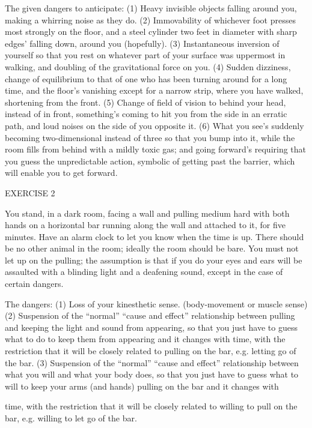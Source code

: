 The given dangers to anticipate: 
(1) Heavy invisible objects falling around you, making a whirring noise as 
they do. 
(2) Immovability of whichever foot presses most strongly on the floor, and 
a steel cylinder two feet in diameter with sharp edges’ falling down, around 
you (hopefully). 
(3) Instantaneous inversion of yourself so that you rest on whatever part of 
your surface was uppermost in walking, and doubling of the gravitational 
force on you. 
(4) Sudden dizziness, change of equilibrium to that of one who has been 
turning around for a long time, and the floor’s vanishing except for a narrow 
strip, where you have walked, shortening from the front. 
(5) Change of field of vision to behind your head, instead of in front, 
something’s coming to hit you from the side in an erratic path, and loud 
noises on the side of you opposite it. 
(6) What you see’s suddenly becoming two-dimensional instead of three so 
that you bump into it, while the room fills from behind with a mildly toxic gas; 
and going forward’s requiring that you guess the unpredictable action, 
symbolic of getting past the barrier, which will enable you to get forward. 


EXERCISE 2 

You stand, in a dark room, facing a wall and pulling medium hard with both 
hands on a horizontal bar running along the wall and attached to it, for five 
minutes. Have an alarm clock to let you know when the time is up. There 
should be no other animal in the room; ideally the room should be bare. You 
must not let up on the pulling; the assumption is that if you do your eyes 
and ears will be assaulted with a blinding light and a deafening sound, 
except in the case of certain dangers. 

The dangers: 
(1) Loss of your kinesthetic sense. (body-movement or muscle sense) 
(2) Suspension of the “normal” “cause and effect” relationship between 
pulling and keeping the light and sound from appearing, so that you just 
have to guess what to do to keep them from appearing and it changes with 
time, with the restriction that it will be closely related to pulling on the bar, 
e.g. letting go of the bar. 
(3) Suspension of the “normal” “cause and effect” relationship between what 
you will and what your body does, so that you just have to guess what to 
will to keep your arms (and hands) pulling on the bar and it changes with 


time, with the restriction that it will be closely related to willing to pull on 
the bar, e.g. willing to let go of the bar. 

